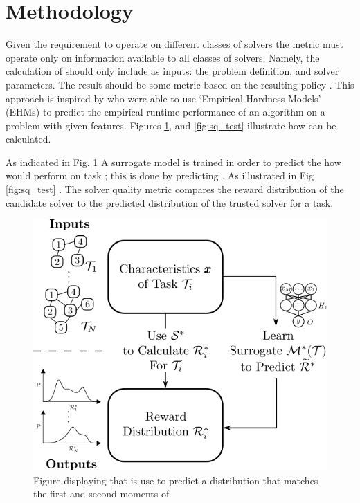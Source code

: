 \section{Methodology}
Given the requirement to operate on different classes of solvers the \xQ{} metric must operate only on information available to all classes of solvers. Namely, the calculation of \xQ{} should only include as inputs: the problem definition, and solver parameters. The result should be some metric based on the resulting policy \policy. This approach is inspired by \cite{Leyton-Brown2009-yr} who were able to use `Empirical Hardness Models' (EHMs) to predict the empirical runtime performance of an algorithm on a problem with given features. Figures \ref{fig:sq_train}, and \ref{fig:sq_test} illustrate how \xQ{} can be calculated.

As indicated in Fig. \ref{fig:sq_train} A surrogate model \surrogate{} is trained in order to predict the how \solvestar{} would perform on task \task; this is done by predicting \rwdstarapprox. As illustrated in Fig \ref{fig:sq_test} . The solver quality metric compares the reward distribution of the candidate solver to the predicted distribution of the trusted solver for a task.

\begin{figure}[tbp]
    \centering
    \includegraphics[width=0.7\linewidth]{Figures/SQ_train.png}
    \caption{Figure displaying that \surrogate{} is use to predict a distribution  \rwdstariapprox{} that matches the first and second moments of \rwdstari}
    \label{fig:sq_train}
\end{figure}%

